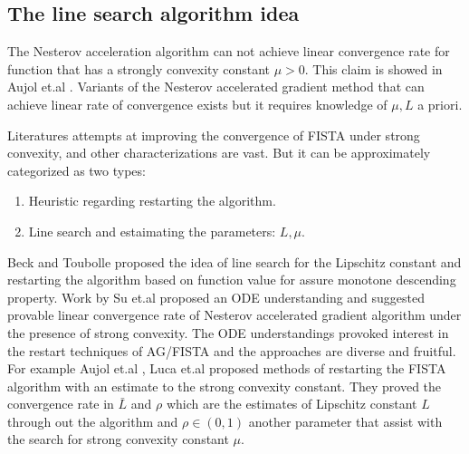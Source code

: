 \documentclass[12pt]{article}
\begin{document}
    \subsection{The line search algorithm idea}
        \par
        The Nesterov acceleration algorithm can not achieve linear convergence rate for function that has a strongly convexity constant $\mu > 0$. 
        This claim is showed in Aujol et.al \cite{aujol_optimal_2019}. 
        Variants of the Nesterov accelerated gradient method that can achieve linear rate of convergence exists but it requires knowledge of $\mu, L$ a priori. 
        \par
        Literatures attempts at improving the convergence of FISTA under strong convexity, and other characterizations are vast. 
        But it can be approximately categorized as two types: 
        \begin{enumerate}
            \item Heuristic regarding restarting the algorithm. 
            \item Line search and estaimating the parameters: $L, \mu$. 
        \end{enumerate}
        Beck and Toubolle \cite{beck_fast_2009} proposed the idea of line search for the Lipschitz constant and restarting the algorithm based on function value for assure monotone descending property. 
        Work by Su et.al \cite{su_differential_2015} proposed an ODE understanding and suggested provable linear convergence rate of Nesterov accelerated gradient algorithm under the presence of strong convexity. 
        The ODE understandings provoked interest in the restart techniques of AG/FISTA and the approaches are diverse and fruitful. 
        For example Aujol et.al \cite{aujol_parameter-free_2023,aujol_fista_2022}, Luca et.al \cite{calatroni_backtracking_2019} proposed methods of restarting the FISTA algorithm with an estimate to the strong convexity constant. 
        They proved the convergence rate in $\bar L$ and $\rho$ which are the estimates of Lipschitz constant $L$ through out the algorithm and $\rho \in (0, 1)$ another parameter that assist with the search for strong convexity constant $\mu$. 
\end{document}
